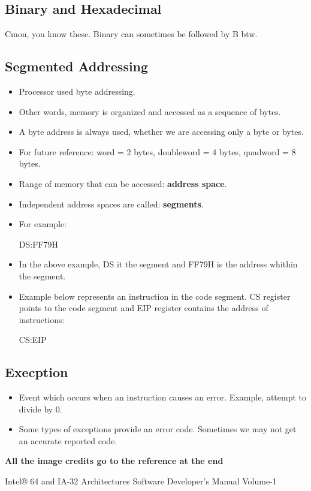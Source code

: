 \documentclass{article}
\begin{document}
\subsection{Binary and Hexadecimal}
Cmon, you know these. Binary can sometimes be followed by B btw.

\subsection{Segmented Addressing}
\begin{itemize}
    \item Processor used byte addressing. 
    \item Other words, memory is organized and accessed as a sequence of bytes. 
    \item A byte address is always used, whether we are accessing only a byte or bytes.
    \item For future reference: word = 2 bytes, doubleword = 4 bytes, quadword = 8 bytes. 
    \item Range of memory that can be accessed: \textbf{address space}.
    \item Independent address spaces are called: \textbf{segments}.
    \item For example: 
    \begin{center}
        DS:FF79H
    \end{center}
    \item In the above example, DS it the segment and FF79H is the address whithin the segment. 
    \item Example below represents an instruction in the code segment. CS register points to the code segment and EIP register contains the address of instructions: 
    \begin{center}
        CS:EIP
    \end{center}
\end{itemize}

\subsection{Execption}
\begin{itemize}
    \item Event which occurs when an instruction causes an error. Example, attempt to divide by 0. 
    \item Some types of exceptions provide an error code. Sometimes we may not get an accurate reported code.
\end{itemize}


\textbf{All the image credits go to the reference at the end}
\begin{thebibliography}{9}
Intel® 64 and IA-32 Architectures Software Developer’s Manual Volume-1\end{thebibliography}
\end{document}
